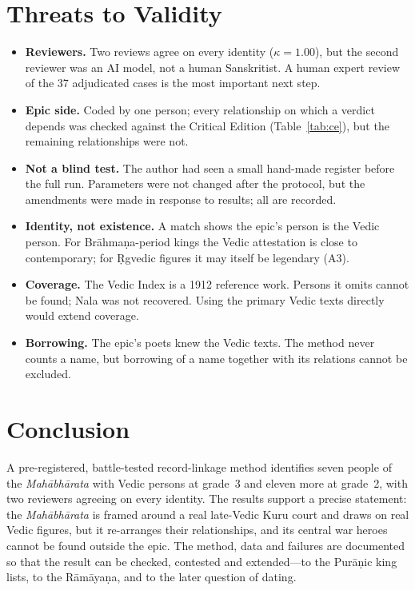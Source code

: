 \documentclass[journal]{IEEEtran}
\newcommand{\MBh}{\textit{Mahābhārata}}
\begin{document}
\section{Threats to Validity}
\begin{itemize}
\item \textbf{Reviewers.} Two reviews agree on every identity ($\kappa=1.00$), but the second reviewer was an AI model,
not a human Sanskritist. A human expert review of the 37 adjudicated cases is the most important next step.
\item \textbf{Epic side.} Coded by one person; every relationship on which a verdict depends was checked against the
Critical Edition (Table~\ref{tab:ce}), but the remaining relationships were not.
\item \textbf{Not a blind test.} The author had seen a small hand-made register before the full run. Parameters were not
changed after the protocol, but the amendments were made in response to results; all are recorded.
\item \textbf{Identity, not existence.} A match shows the epic's person is the Vedic person. For Brāhmaṇa-period kings the
Vedic attestation is close to contemporary; for Ṛgvedic figures it may itself be legendary (A3).
\item \textbf{Coverage.} The Vedic Index is a 1912 reference work. Persons it omits cannot be found; Nala was not
recovered. Using the primary Vedic texts directly would extend coverage.
\item \textbf{Borrowing.} The epic's poets knew the Vedic texts. The method never counts a name, but borrowing of a name
together with its relations cannot be excluded.
\end{itemize}

\section{Conclusion}
A pre-registered, battle-tested record-linkage method identifies seven people of the \MBh{} with Vedic persons at
grade~3 and eleven more at grade~2, with two reviewers agreeing on every identity. The results support a precise statement: the \MBh{} is framed around a real
late-Vedic Kuru court and draws on real Vedic figures, but it re-arranges their relationships, and its central war
heroes cannot be found outside the epic. The method, data and failures are documented so that the result can be
checked, contested and extended---to the Purāṇic king lists, to the Rāmāyaṇa, and to the later question of dating.
\end{document}
